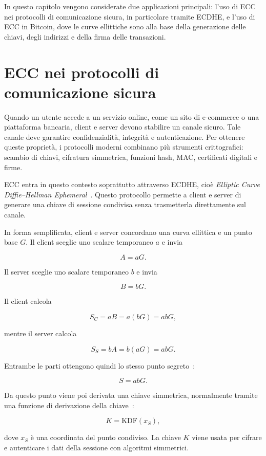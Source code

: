 \documentclass[12pt,a4paper,oneside]{report}
\begin{document}
In questo capitolo vengono considerate due applicazioni principali: l'uso di ECC nei protocolli di comunicazione sicura, in particolare tramite ECDHE, e l'uso di ECC in Bitcoin, dove le curve ellittiche sono alla base della generazione delle chiavi, degli indirizzi e della firma delle transazioni.

\section{ECC nei protocolli di comunicazione sicura}

Quando un utente accede a un servizio online, come un sito di e-commerce o una piattaforma bancaria, client e server devono stabilire un canale sicuro. Tale canale deve garantire confidenzialità, integrità e autenticazione. Per ottenere queste proprietà, i protocolli moderni combinano più strumenti crittografici: scambio di chiavi, cifratura simmetrica, funzioni hash, MAC, certificati digitali e firme.

ECC entra in questo contesto soprattutto attraverso ECDHE, cioè \textit{Elliptic Curve Diffie--Hellman Ephemeral}~\cite{margara_ssl,sec1}. Questo protocollo permette a client e server di generare una chiave di sessione condivisa senza trasmetterla direttamente sul canale.

In forma semplificata, client e server concordano una curva ellittica e un punto base \(G\). Il client sceglie uno scalare temporaneo \(a\) e invia

\[
A=aG.
\]

Il server sceglie uno scalare temporaneo \(b\) e invia

\[
B=bG.
\]

Il client calcola

\[
S_C=aB=a(bG)=abG,
\]

mentre il server calcola

\[
S_S=bA=b(aG)=abG.
\]

Entrambe le parti ottengono quindi lo stesso punto segreto~\cite{margara_ssl,sec1}:

\[
S=abG.
\]

Da questo punto viene poi derivata una chiave simmetrica, normalmente tramite una funzione di derivazione della chiave~\cite{sec1}:

\[
K=\mathrm{KDF}(x_S),
\]

dove \(x_S\) è una coordinata del punto condiviso. La chiave \(K\) viene usata per cifrare e autenticare i dati della sessione con algoritmi simmetrici.
\end{document}
